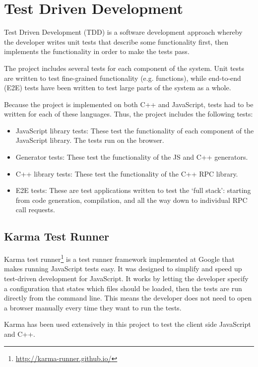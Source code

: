 \section{Test Driven Development} %
\label{sec:test_driven_development}
Test Driven Development (TDD) is a software development approach whereby the developer writes unit tests that describe some functionality first, then implements the functionality in order to make the tests pass.

The project includes several tests for each component of the system. Unit tests are written to test fine-grained functionality (e.g. functions), while end-to-end (E2E) tests have been written to test large parts of the system as a whole.

Because the project is implemented on both C++ and JavaScript, tests had to be written for each of these languages. Thus, the project includes the following tests:

\begin{itemize}
	\item JavaScript library tests: These test the functionality of each component of the JavaScript library. The tests run on the browser.
	\item Generator tests: These test the functionality of the JS and C++ generators.
	\item C++ library tests: These test the functionality of the C++ RPC library.
	\item E2E tests: These are test applications written to test the `full stack': starting from code generation, compilation, and all the way down to individual RPC call requests.
\end{itemize}

\subsection{Karma Test Runner} %
\label{sub:karma_test_runner}
Karma test runner\footnote{\url{http://karma-runner.github.io/}} is a test runner framework implemented at Google that makes running JavaScript tests easy. It was designed to simplify and speed up test-driven development for JavaScript. It works by letting the developer specify a configuration that states which files should be loaded, then the tests are run directly from the command line. This means the developer does not need to open a browser manually every time they want to run the tests.

Karma has been used extensively in this project to test the client side JavaScript and C++.


